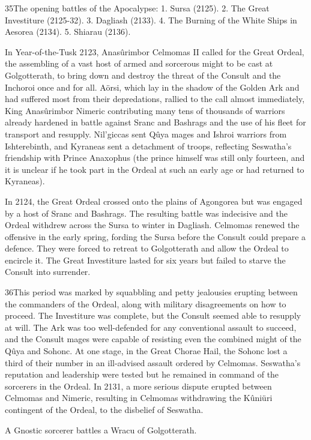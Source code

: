 \documentclass[]{book}
\begin{document}
35The opening battles of the Apocalypse: 1. Sursa (2125). 2. The Great Investiture (2125-32). 3. Dagliash
(2133). 4. The Burning of the White Ships in Aesorea (2134). 5. Shiarau (2136).

In Year-of-the-Tusk 2123, Anasûrimbor Celmomas II called for the Great Ordeal, the
assembling of a vast host of armed and sorcerous might to be cast at Golgotterath, to
bring down and destroy the threat of the Consult and the Inchoroi once and for all.
Aörsi, which lay in the shadow of the Golden Ark and had suffered most from their
depredations, rallied to the call almost immediately, King Anasûrimbor Nimeric
contributing many tens of thousands of warriors already hardened in battle against
Sranc and Bashrags and the use of his fleet for transport and resupply. Nil'giccas sent
Qûya mages and Ishroi warriors from Ishterebinth, and Kyraneas sent a detachment of
troops, reflecting Seswatha's friendship with Prince Anaxophus (the prince himself was
still only fourteen, and it is unclear if he took part in the Ordeal at such an early age or
had returned to Kyraneas).

In 2124, the Great Ordeal crossed onto the plains of Agongorea but was engaged by a
host of Sranc and Bashrags. The resulting battle was indecisive and the Ordeal
withdrew across the Sursa to winter in Dagliash. Celmomas renewed the offensive in
the early spring, fording the Sursa before the Consult could prepare a defence. They
were forced to retreat to Golgotterath and allow the Ordeal to encircle it. The Great
Investiture lasted for six years but failed to starve the Consult into surrender.

36This period was marked by squabbling and petty jealousies erupting between the
commanders of the Ordeal, along with military disagreements on how to proceed. The
Investiture was complete, but the Consult seemed able to resupply at will. The Ark was
too well-defended for any conventional assault to succeed, and the Consult mages were
capable of resisting even the combined might of the Qûya and Sohonc. At one stage, in
the Great Chorae Hail, the Sohonc lost a third of their number in an ill-advised assault
ordered by Celmomas. Seswatha's reputation and leadership were tested but he
remained in command of the sorcerers in the Ordeal. In 2131, a more serious dispute
erupted between Celmomas and Nimeric, resulting in Celmomas withdrawing the
Kûniüri contingent of the Ordeal, to the disbelief of Seswatha.

A Gnostic sorcerer battles a Wracu of Golgotterath.
\end{document}
